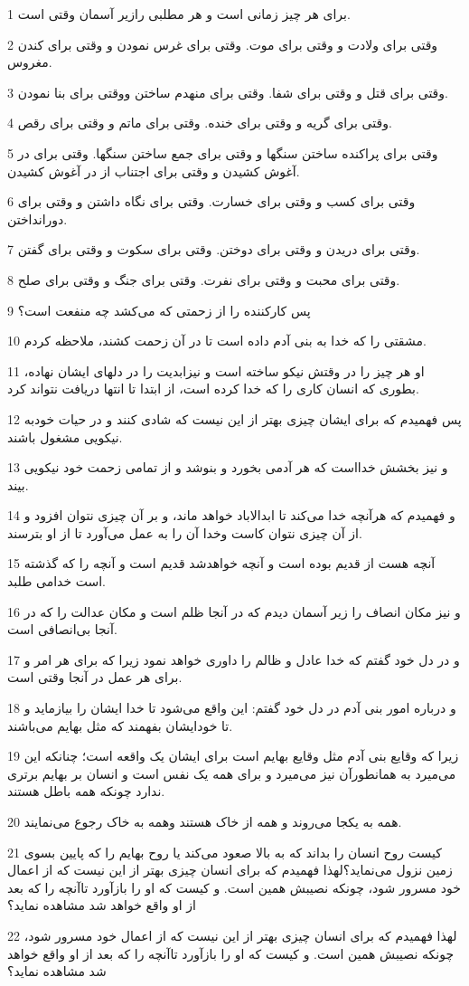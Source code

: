 \par 1 برای هر چیز زمانی است و هر مطلبی رازیر آسمان وقتی است.
\par 2 وقتی برای ولادت و وقتی برای موت. وقتی برای غرس نمودن و وقتی برای کندن مغروس.
\par 3 وقتی برای قتل و وقتی برای شفا. وقتی برای منهدم ساختن ووقتی برای بنا نمودن.
\par 4 وقتی برای گریه و وقتی برای خنده. وقتی برای ماتم و وقتی برای رقص.
\par 5 وقتی برای پراکنده ساختن سنگها و وقتی برای جمع ساختن سنگها. وقتی برای در آغوش کشیدن و وقتی برای اجتناب از در آغوش کشیدن.
\par 6 وقتی برای کسب و وقتی برای خسارت. وقتی برای نگاه داشتن و وقتی برای دورانداختن.
\par 7 وقتی برای دریدن و وقتی برای دوختن. وقتی برای سکوت و وقتی برای گفتن.
\par 8 وقتی برای محبت و وقتی برای نفرت. وقتی برای جنگ و وقتی برای صلح.
\par 9 پس کارکننده را از زحمتی که می‌کشد چه منفعت است؟
\par 10 مشقتی را که خدا به بنی آدم داده است تا در آن زحمت کشند، ملاحظه کردم.
\par 11 او هر چیز را در وقتش نیکو ساخته است و نیزابدیت را در دلهای ایشان نهاده، بطوری که انسان کاری را که خدا کرده است، از ابتدا تا انتها دریافت نتواند کرد.
\par 12 پس فهمیدم که برای ایشان چیزی بهتر از این نیست که شادی کنند و در حیات خودبه نیکویی مشغول باشند.
\par 13 و نیز بخشش خدااست که هر آدمی بخورد و بنوشد و از تمامی زحمت خود نیکویی بیند.
\par 14 و فهمیدم که هرآنچه خدا می‌کند تا ابدالاباد خواهد ماند، و بر آن چیزی نتوان افزود و از آن چیزی نتوان کاست وخدا آن را به عمل می‌آورد تا از او بترسند.
\par 15 آنچه هست از قدیم بوده است و آنچه خواهدشد قدیم است و آنچه را که گذشته است خدامی طلبد.
\par 16 و نیز مکان انصاف را زیر آسمان دیدم که در آنجا ظلم است و مکان عدالت را که در آنجا بی‌انصافی است.
\par 17 و در دل خود گفتم که خدا عادل و ظالم را داوری خواهد نمود زیرا که برای هر امر و برای هر عمل در آنجا وقتی است.
\par 18 و درباره امور بنی آدم در دل خود گفتم: این واقع می‌شود تا خدا ایشان را بیازماید و تا خودایشان بفهمند که مثل بهایم می‌باشند.
\par 19 زیرا که وقایع بنی آدم مثل وقایع بهایم است برای ایشان یک واقعه است؛ چنانکه این می‌میرد به همانطورآن نیز می‌میرد و برای همه یک نفس است و انسان بر بهایم برتری ندارد چونکه همه باطل هستند.
\par 20 همه به یکجا می‌روند و همه از خاک هستند وهمه به خاک رجوع می‌نمایند.
\par 21 کیست روح انسان را بداند که به بالا صعود می‌کند یا روح بهایم را که پایین بسوی زمین نزول می‌نماید؟لهذا فهمیدم که برای انسان چیزی بهتر از این نیست که از اعمال خود مسرور شود، چونکه نصیبش همین است. و کیست که او را بازآورد تاآنچه را که بعد از او واقع خواهد شد مشاهده نماید؟
\par 22 لهذا فهمیدم که برای انسان چیزی بهتر از این نیست که از اعمال خود مسرور شود، چونکه نصیبش همین است. و کیست که او را بازآورد تاآنچه را که بعد از او واقع خواهد شد مشاهده نماید؟
 
